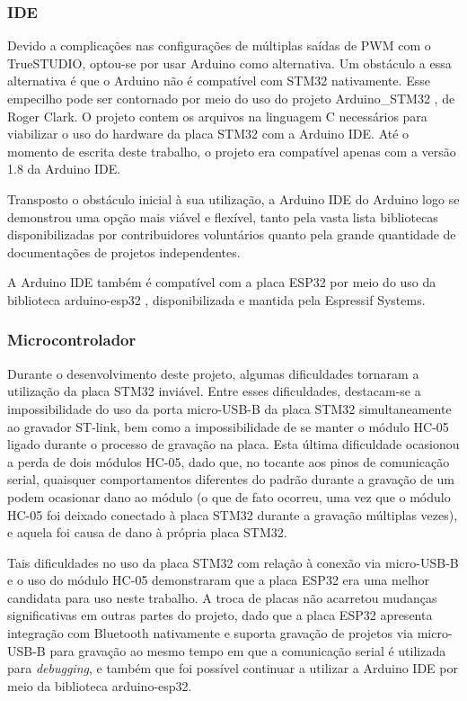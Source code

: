\subsubsection{IDE}

Devido a complicações nas configurações de múltiplas saídas de PWM com o 
TrueSTUDIO, optou-se por usar Arduino como alternativa. Um obstáculo a essa
alternativa é que o Arduino não é compatível com STM32 nativamente. Esse
empecilho pode ser contornado por meio do uso do projeto Arduino\_STM32
\cite{arduino_stm32}, de Roger Clark. O projeto contem os arquivos na linguagem
C necessários para viabilizar o uso do hardware da placa STM32 com a Arduino IDE.
Até o momento de escrita deste trabalho, o projeto era compatível apenas com a
versão 1.8 da Arduino IDE.

Transposto o obstáculo inicial à sua utilização, a Arduino IDE do Arduino 
logo se demonstrou uma opção mais viável e flexível, tanto pela vasta lista
bibliotecas disponibilizadas por contribuidores voluntários quanto pela grande
quantidade de documentações de projetos independentes.

A Arduino IDE também é compatível com a placa ESP32 por meio do uso da
biblioteca arduino-esp32 \cite{arduino_esp32}, disponibilizada e mantida
pela Espressif Systems.

\subsubsection{Microcontrolador}

Durante o desenvolvimento deste projeto, algumas dificuldades tornaram a
utilização da placa STM32 inviável. Entre esses dificuldades, destacam-se a
impossibilidade do uso da porta micro-USB-B da placa STM32 simultaneamente ao
gravador ST-link, bem como a impossibilidade de se manter o módulo HC-05 ligado
durante o processo de gravação na placa. Esta última dificuldade ocasionou a
perda de dois módulos HC-05, dado que, no tocante aos pinos de comunicação serial,
quaisquer comportamentos diferentes do padrão durante a gravação de um podem
ocasionar dano ao módulo (o que de fato ocorreu, uma vez que o módulo HC-05 foi
deixado conectado à placa STM32 durante a gravação múltiplas vezes), e aquela
foi causa de dano à própria placa STM32.

Tais dificuldades no uso da placa STM32 com relação à conexão via micro-USB-B e
o uso do módulo HC-05 demonstraram que a placa ESP32 era uma melhor candidata 
para uso neste trabalho. A troca de placas não acarretou mudanças significativas
em outras partes do projeto, dado que a placa ESP32 apresenta integração
com Bluetooth nativamente e suporta gravação de projetos via micro-USB-B
para gravação ao mesmo tempo em que a comunicação serial é utilizada para
\textit{debugging}, e também que foi possível continuar a utilizar a Arduino IDE
por meio da biblioteca arduino-esp32.